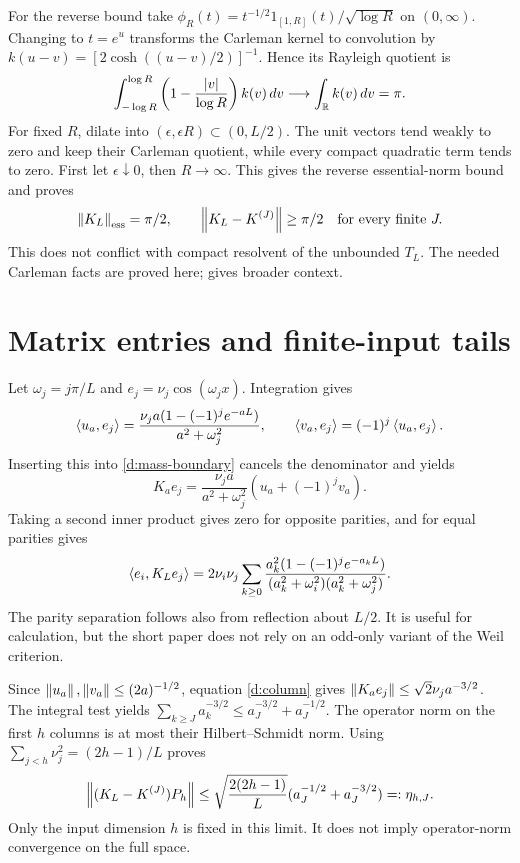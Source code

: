 For the reverse bound take
$\phi_R(t)=t^{-1/2}1_{[1,R]}(t)/\sqrt{\log R}$ on $(0,\infty)$.
Changing to $t=e^u$ transforms the Carleman kernel to convolution by
$k(u-v)=[2\cosh((u-v)/2)]^{-1}$. Hence its Rayleigh quotient is
\[
\int_{-\log R}^{\log R}
\left(1-\frac{|v|}{\log R}\right)k(v)\,dv\longrightarrow
\int_\mathbb R k(v)\,dv=\pi.
\]
For fixed $R$, dilate into $(\epsilon,\epsilon R)\subset(0,L/2)$.
The unit vectors tend weakly to zero and keep their Carleman quotient,
while every compact quadratic term tends to zero. First let
$\epsilon\downarrow0$, then $R\to\infty$. This gives the reverse
essential-norm bound and proves
\[
\left\lVert K_L\right\rVert_{\rm ess}=\pi/2,\qquad
\left\lVert K_L-K^{(J)}\right\rVert\ge\pi/2\quad\text{for every finite }J.
\]
This does not conflict with compact resolvent of the unbounded $T_L$.
The needed Carleman facts are proved here; \cite{Yafaev} gives broader context.

\section{Matrix entries and finite-input tails}
Let $\omega_j=j\pi/L$ and $e_j=\nu_j\cos(\omega_jx)$. Integration gives
\[
\left\langle u_a,e_j\right\rangle=\frac{\nu_ja(1-(-1)^je^{-aL})}{a^2+\omega_j^2},\qquad
\left\langle v_a,e_j\right\rangle=(-1)^j\left\langle u_a,e_j\right\rangle.
\]
Inserting this into \eqref{d:mass-boundary} cancels the denominator and yields
\begin{equation}\label{d:column}
K_ae_j=\frac{\nu_ja}{a^2+\omega_j^2}(u_a+(-1)^jv_a).
\end{equation}
Taking a second inner product gives zero for opposite parities, and for
equal parities gives
\begin{equation}\label{d:entries}
\left\langle e_i,K_Le_j\right\rangle=2\nu_i\nu_j\sum_{k\ge0}
\frac{a_k^2(1-(-1)^je^{-a_kL})}
{(a_k^2+\omega_i^2)(a_k^2+\omega_j^2)}.
\end{equation}
The parity separation follows also from reflection about $L/2$.
It is useful for calculation, but the short paper does not rely on an
odd-only variant of the Weil criterion.

Since $\left\lVert u_a\right\rVert,\left\lVert v_a\right\rVert\le(2a)^{-1/2}$, equation \eqref{d:column}
gives $\left\lVert K_ae_j\right\rVert\le\sqrt2\nu_ja^{-3/2}$.
The integral test yields
$\sum_{k\ge J}a_k^{-3/2}\le a_J^{-3/2}+a_J^{-1/2}$.
The operator norm on the first $h$ columns is at most their Hilbert--Schmidt
norm. Using $\sum_{j<h}\nu_j^2=(2h-1)/L$ proves
\begin{equation}\label{d:column-tail}
\left\lVert(K_L-K^{(J)})P_h\right\rVert\le
\sqrt{\frac{2(2h-1)}L}(a_J^{-1/2}+a_J^{-3/2})=:\eta_{h,J}.
\end{equation}
Only the input dimension $h$ is fixed in this limit. It does not imply
operator-norm convergence on the full space.

